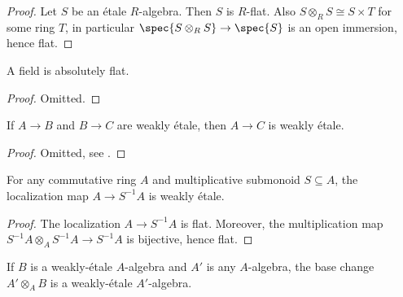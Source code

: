 \begin{proof}
    \leanok
    Let $S$ be an étale $R$-algebra. Then $S$ is $R$-flat. Also
    $S \otimes_{R} S \cong S × T$ for some ring $T$, in particular $\spec{S \otimes_{R} S} \to \spec{S}$ is
    an open immersion, hence flat.
\end{proof}

\begin{lemma}
    \label{lem:field-absolutely-flat}
    A field is absolutely flat.
    \leanok
\end{lemma}

\begin{proof}
    \leanok
    Omitted.
\end{proof}

\begin{lemma}[\stacksproject{092J}]
    \label{lem:weakly-etale-comp}
    \leanok
    If $A \to B$ and $B \to C$ are weakly étale, then $A \to C$ is weakly étale.
\end{lemma}

\begin{proof}
    \leanok
    Omitted, see .
\end{proof}

\begin{lemma}[\stacksproject{092J}]
    \label{lem:weakly-etale-localization}
    \leanok
    For any commutative ring $A$ and multiplicative submonoid $S \subseteq A$, the
    localization map $A \to S^{-1} A$ is weakly étale.
\end{lemma}

\begin{proof}
    \leanok
    The localization $A \to S^{-1} A$ is flat. Moreover, the multiplication map
    $S^{-1} A \otimes_{A} S^{-1} A \to S^{-1} A$ is bijective, hence flat.
\end{proof}

\begin{lemma}[\stacksproject{092H}]
    \label{lem:weakly-etale-base-change}
    If $B$ is a weakly-étale $A$-algebra and $A'$ is any $A$-algebra, the base change
    $A' \otimes_{A} B$ is a weakly-étale $A'$-algebra.
    \leanok
    \mathlibok
\end{lemma}

